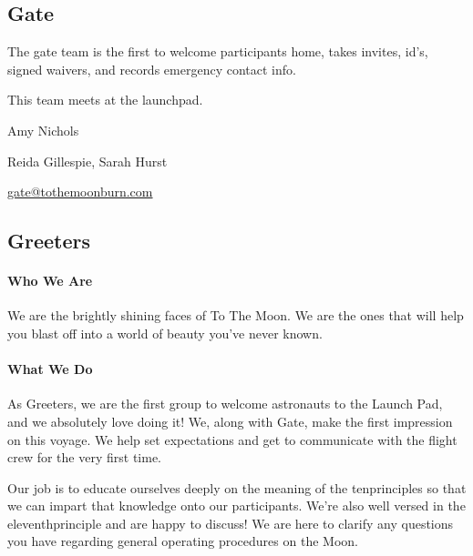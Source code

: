 \subsection*{Gate}
The \gls{gate} team is the first to welcome participants home, takes invites, id's, signed waivers, and records emergency contact info.

This team meets at the \gls{launchpad}.

\begin{description}[leftmargin=6em,noitemsep,style=nextline]
   \item[Lead:] Amy Nichols
   \item[Co-leads:] Reida Gillespie, Sarah Hurst
   \item[Contact:] \url{gate@tothemoonburn.com}
\end{description}


\subsection*{Greeters}

\paragraph{Who We Are}
We are the brightly shining faces of To The Moon.  We are the ones that will help you blast off into a world of beauty you've never known.

\paragraph{What We Do}

As Greeters, we are the first group to welcome astronauts to the Launch Pad, and we absolutely love doing it!  We, along with Gate, make the first impression on this voyage.  We help set expectations and get to communicate with the flight crew for the very first time. 

Our job is to educate ourselves deeply on the meaning of the \gls{tenprinciples} so that we can impart that knowledge onto our participants.  We're also well versed in the \gls{eleventhprinciple} and are happy to discuss!  We are here to clarify any questions you have regarding general operating procedures on the Moon. 

